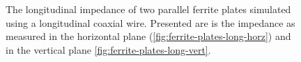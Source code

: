 \begin{figure}
\caption{The longitudinal impedance of two parallel ferrite plates simulated using a longitudinal coaxial wire. Presented are is the impedance as measured in the horizontal plane (\ref{fig:ferrite-plates-long-horz}) and in the vertical plane \ref{fig:ferrite-plates-long-vert}.}
\label{fig:ferrite-plates-long}
\end{figure}

